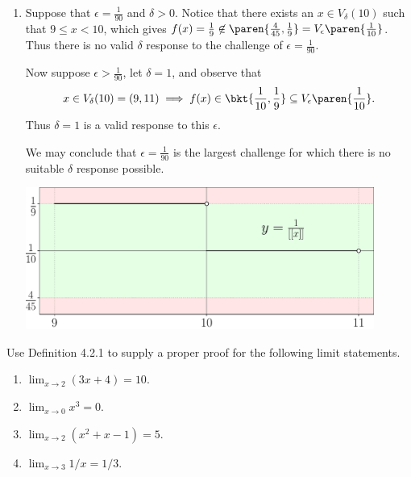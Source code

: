 \documentclass{lew98_solutions}
\begin{document}
\begin{solution}
\begin{enumerate}
        \item Suppose that \( \epsilon = \tfrac{1}{90} \) and \( \delta > 0 \). Notice that there exists an \( x \in V_{\delta}(10) \) such that \( 9 \leq x < 10 \), which gives \( f(x) = \tfrac{1}{9} \not\in \paren{ \tfrac{4}{45}, \tfrac{1}{9} } = V_{\epsilon} \paren{ \tfrac{1}{10} } \). Thus there is no valid \( \delta \) response to the challenge of \( \epsilon = \tfrac{1}{90} \).
        
        Now suppose \( \epsilon > \tfrac{1}{90} \), let \( \delta = 1 \), and observe that
        \[
            x \in V_{\delta}(10) = (9, 11) \implies f(x) \in \bkt{ \frac{1}{10}, \frac{1}{9} } \subseteq V_{\epsilon} \paren{ \frac{1}{10} }.
        \]
        Thus \( \delta = 1 \) is a valid response to this \( \epsilon \).

        We may conclude that \( \epsilon = \tfrac{1}{90} \) is the largest challenge for which there is no suitable \( \delta \) response possible.
        \begin{center}
            \includegraphics[width=0.9\textwidth]{UA_Figures/UA_ex4_2_4_fig_3.pdf}
        \end{center}
    \end{enumerate}
\end{solution}

\begin{exercise}
\label{ex:4.2.5}
    Use Definition 4.2.1 to supply a proper proof for the following limit statements.
    \begin{enumerate}
        \item \( \lim_{x \to 2} (3x + 4) = 10 \).

        \item \( \lim_{x \to 0} x^3 = 0 \).

        \item \( \lim_{x \to 2} (x^2 + x - 1) = 5 \).

        \item \( \lim_{x \to 3} 1/x = 1/3 \).
    \end{enumerate}
\end{exercise}
\end{document}
